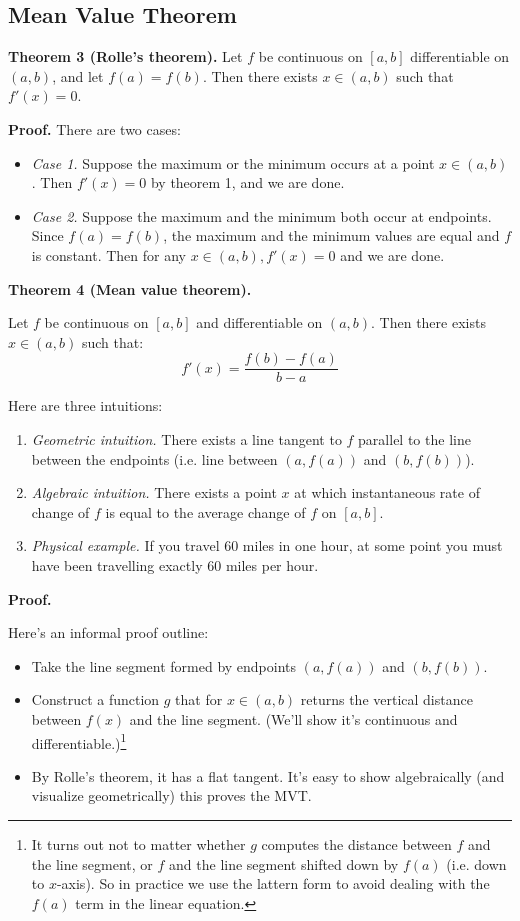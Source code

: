 \subsection{Mean Value Theorem}

\textbf{Theorem 3 (Rolle's theorem).} Let $f$ be continuous on $[a,b]$
differentiable on $(a,b)$, and let $f(a)=f(b)$. Then there exists
$x\in(a,b)$ such that $f'(x)=0$.

\vs

\textbf{Proof.} There are two cases:
\begin{itemize}
\item \textit{Case 1.} Suppose the maximum or the minimum occurs at a
  point $x\in(a,b)$. Then $f'(x)=0$ by theorem 1, and we are done.
\item \textit{Case 2.} Suppose the maximum and the minimum both occur
  at endpoints. Since $f(a)=f(b)$, the maximum and the minimum values
  are equal and $f$ is constant. Then for any $x\in(a,b), f'(x)=0$ and
  we are done.
\end{itemize}

\textbf{Theorem 4 (Mean value theorem).}

Let $f$ be continuous on $[a,b]$ and differentiable on $(a,b)$. Then
there exists $x\in(a,b)$ such that:
\[f'(x)=\frac{f(b)-f(a)}{b-a}\]

Here are three intuitions:
\begin{enumerate}
\item \textit{Geometric intuition.} There exists a line tangent to $f$
  parallel to the line between the endpoints (i.e. line between
  $(a, f(a))$ and $(b, f(b))$).
\item \textit{Algebraic intuition.} There exists a point $x$ at which
  instantaneous rate of change of $f$ is equal to the average change
  of $f$ on $[a,b]$.
\item \textit{Physical example.} If you travel 60 miles in one hour,
  at some point you must have been travelling exactly 60 miles per
  hour.
\end{enumerate}

\textbf{Proof.}

Here's an informal proof outline:
\begin{itemize}
\item Take the line segment formed by endpoints $(a,f(a))$ and
  $(b,f(b))$.
\item Construct a function $g$ that for $x\in(a,b)$ returns the vertical
  distance between $f(x)$ and the line segment. (We'll show it's
  continuous and differentiable.)\footnote{It turns out not to matter
    whether $g$ computes the distance between $f$ and the line
    segment, or $f$ and the line segment shifted down by $f(a)$ (i.e.
    down to $x$-axis). So in practice we use the lattern form to avoid
    dealing with the $f(a)$ term in the linear equation.}
\item By Rolle's theorem, it has a flat tangent. It's easy to show
  algebraically (and visualize geometrically) this proves the MVT.
\end{itemize}

